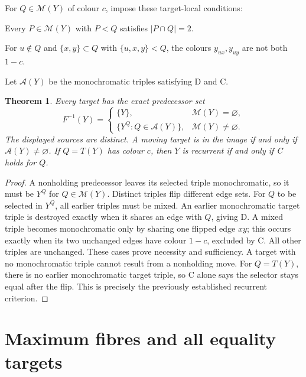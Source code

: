 \documentclass[a4paper,10pt]{amsart}
\newtheorem{theorem}{Theorem}[section]
\theoremstyle{remark}
\newcommand{\M}{\mathcal M}
\newcommand{\A}{\mathcal A}
\begin{document}
For $Q\in\M(Y)$ of colour $c$, impose these target-local conditions:
\begin{description}[leftmargin=2em,labelwidth=1.6em]
\item[D] Every $P\in\M(Y)$ with $P<Q$ satisfies $|P\cap Q|=2$.
\item[C] For $u\notin Q$ and $\{x,y\}\subset Q$ with
$\{u,x,y\}<Q$, the colours $y_{ux},y_{uy}$ are not both $1-c$.
\end{description}
Let $\A(Y)$ be the monochromatic triples satisfying D and C.

\begin{theorem}\label{thm:inverse}
Every target has the exact predecessor set
\[
F^{-1}(Y)=\begin{cases}
\{Y\},&\M(Y)=\varnothing,\\
\{Y^Q:Q\in\A(Y)\},&\M(Y)\ne\varnothing.
\end{cases}
\]
The displayed sources are distinct. A moving target is in the image if
and only if $\A(Y)\ne\varnothing$. If $Q=T(Y)$ has colour $c$, then
$Y$ is recurrent if and only if C holds for $Q$.
\end{theorem}
\begin{proof}
A nonholding predecessor leaves its selected triple monochromatic, so
it must be $Y^Q$ for $Q\in\M(Y)$. Distinct triples flip different edge
sets. For $Q$ to be selected in $Y^Q$, all earlier triples must be mixed.
An earlier monochromatic target triple is destroyed exactly when it
shares an edge with $Q$, giving D. A mixed triple becomes monochromatic
only by sharing one flipped edge $xy$; this occurs exactly when its two
unchanged edges have colour $1-c$, excluded by C. All other triples are
unchanged. These cases prove necessity and sufficiency. A target with no
monochromatic triple cannot result from a nonholding move.
For $Q=T(Y)$, there is no earlier monochromatic target triple, so C
alone says the selector stays equal after the flip. This is precisely
the previously established recurrent criterion.
\end{proof}

\section{Maximum fibres and all equality targets}
\end{document}
